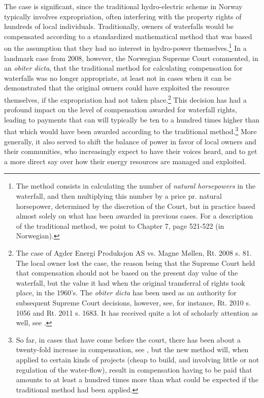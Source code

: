 The case is significant, since the traditional hydro-electric scheme in Norway typically involves expropriation, often interfering with the property rights of hundreds of local individuals. Traditionally, owners of waterfalls would be compensated according to a standardized mathematical method that was based on the assumption that they had no interest in hydro-power themselves.\footnote{The method consists in calculating the number of \emph{natural horsepowers} in the waterfall, and then multiplying this number by a price pr. natural horsepower, determined by the discretion of the Court, but in practice based almost solely on what has been awarded in previous cases. For a description of the traditional method, we point to \cite{falk} Chapter 7, page 521-522 (in Norwegian).} In a landmark case from 2008, however, the Norwegian Supreme Court commented, in an \emph{obiter dicta}, that the traditional method for calculating compensation for waterfalls was no longer appropriate, at least not in cases when it can be demonstrated that the original owners could have exploited the resource themselves, if the expropriation had not taken place.\footnote{The case of Agder Energi Produksjon AS vs. Magne Møllen, Rt. 2008 s. 81. The local owner lost the case, the reason being that the Supreme Court held that compensation should not be based on the present day value of the waterfall, but the value it had when the original transferral of rights took place, in the 1960's. The \emph{obiter dicta} has been used as an authority for subsequent Supreme Court decisions, however, see, for instance, Rt. 2010 s. 1056 and Rt. 2011 s. 1683. It has received quite a lot of scholarly attention as well, see \cite{Tf1,Tf2,Tf3}.} This decision has had a profound impact on the level of compensation awarded for waterfall rights, leading to payments that can will typically be ten to a hundred times higher than that which would have been awarded according to the traditional method.\footnote{So far, in cases that have come before the court, there has been about a twenty-fold increase in compensation, see \cite{Tf1}, but the new method will, when applied to certain kinds of projects (cheap to build, and involving little or not regulation of the water-flow), result in compensation having to be paid that amounts to at least a hundred times more than what could be expected if the traditional method had been applied.} More generally, it also served to shift the balance of power in favor of local owners and their communities, who increasingly expect to have their voices heard, and to get a more direct say over how their energy resources are managed and exploited.

